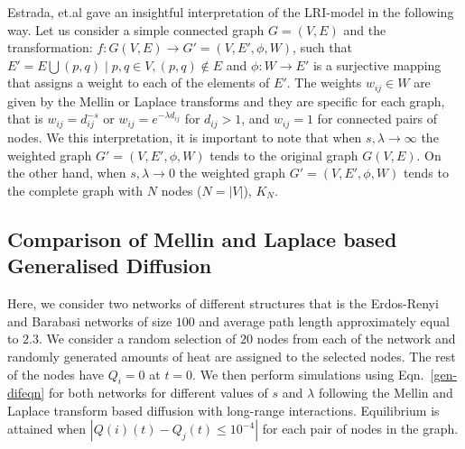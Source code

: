 \documentclass[10pt,a4paper]{article}
\begin{document}
        Estrada, et.al \citep{estrada2017long} gave an insightful interpretation of the  LRI-model in the following way.
        Let us consider a simple connected graph $G=(V,E)$ and the transformation: $f: G(V,E) \longrightarrow G'=(V, E', \phi, W)$, such that $E' ={E \bigcup (p,q)\mid p,q \in V, (p,q) \notin E} $ and $\phi:W \longrightarrow E'$ is a surjective mapping that assigns a weight to each of the elements of $E'$. The weights $w_{ij} \in W$ are given by the Mellin or Laplace transforms and they are specific for each graph, that is $w_{ij} = d_{ij}^{-s}$ or $w_{ij} = e^{-\lambda d_{ij}}$ for $d_{ij} >1$, and $w_{ij} =1$ for connected pairs of nodes. We this interpretation, it is important to note that when $ s, \lambda \longrightarrow \infty$ the weighted graph $G'=(V, E', \phi, W)$ tends to the original graph $G(V,E)$. On the other hand, when $ s, \lambda \longrightarrow 0$ the weighted graph $G'=(V, E', \phi, W)$ tends to the complete graph with $N$ nodes ($N = |V|$), $K_{N}$.
        
        \subsection{Comparison of Mellin and Laplace based Generalised Diffusion}
        Here, we consider two networks of different structures that is the Erdos-Renyi\citep{erdos1959random,karonski1982review,newman2002random} and Barabasi networks \citep{barabasi1999emergence,newman2002random} of size $100$ and average path length approximately equal to $2.3$. We consider a random selection of $20$ nodes from each of the network and randomly generated amounts of heat are assigned to the selected nodes. The rest of the nodes have $Q_i = 0$ at $t=0$. We then perform simulations using Eqn.~\ref{gen-difeqn} for both networks for different values of $s$ and $\lambda$ following the Mellin and Laplace transform based diffusion with long-range interactions. Equilibrium is attained when $|Q(i)(t) -Q_j(t) \leq 10^{-4}|$ for each pair of nodes in the graph.
        	
\end{document}
